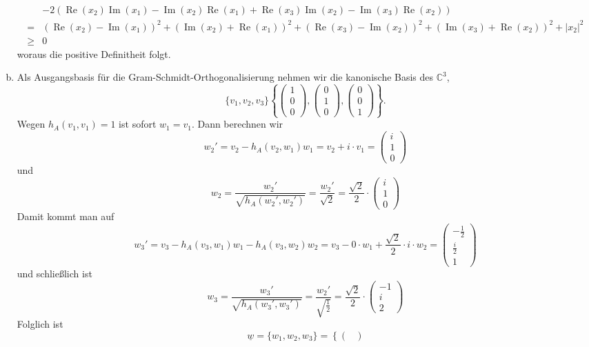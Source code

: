 \documentclass{article}
\theoremstyle{definition}
\newcommand{\C}{\mathbb{C}}
\newcommand{\re}{\operatorname{Re}}
\newcommand{\Ima}{\operatorname{Im}}
\begin{document}
\begin{enumerate}[(a)]
\begin{align*}
		 &- 2(\re(x_2)\Ima(x_1) - \Ima(x_2)\re(x_1) + \re(x_3)\Ima(x_2) -\Ima(x_3)\re(x_2))\\
		=& (\re(x_2) - \Ima(x_1))^2 + (\Ima(x_2) + \re(x_1))^2 + (\re(x_3) - \Ima(x_2))^2 + (\Ima(x_3) + \re(x_2))^2 + |x_2|^2\\
		\geq&0
	\end{align*} woraus die positive Definitheit folgt.
	\item Als Ausgangsbasis für die Gram-Schmidt-Orthogonalisierung nehmen wir die kanonische Basis des $\C^3$, $$\{v_1, v_2, v_3\} \left\{\begin{pmatrix}
		1\\0\\0
	\end{pmatrix}, \begin{pmatrix}
		0\\1\\0
	\end{pmatrix}, \begin{pmatrix}
		0\\0\\1
	\end{pmatrix}\right\}.$$ Wegen $h_A(v_1, v_1) = 1$ ist sofort $w_1 = v_1$. Dann berechnen wir $$w_2' = v_2 - h_A(v_2, w_1)w_1 = v_2 + i\cdot v_1 = \begin{pmatrix}
		i\\
		1\\
		0
	\end{pmatrix}$$
	und $$w_2 = \frac{w_2'}{\sqrt{h_A(w_2', w_2')}} = \frac{w_2'}{\sqrt{2}} = \frac{\sqrt{2}}{2}\cdot \begin{pmatrix}
		i\\
		1\\
		0
	\end{pmatrix}$$
	Damit kommt man auf $$w_3' = v_3 - h_A(v_3, w_1)w_1 - h_A(v_3, w_2)w_2 = v_3 - 0\cdot w_1 + \frac{\sqrt{2}}{2}\cdot i \cdot w_2 = \begin{pmatrix}
		-\frac{1}{2}\\
		\frac{i}{2}\\
		1
	\end{pmatrix}$$
	und schließlich ist $$w_3 = \frac{w_3'}{\sqrt{h_A(w_3', w_3')}} = \frac{w_2'}{\sqrt{\frac{1}{2}}} = \frac{\sqrt{2}}{2}\cdot \begin{pmatrix}
		-1\\
		i\\
		2
	\end{pmatrix}$$
	Folglich ist $$\underline{w} = \{w_1, w_2, w_3\} = \left\{\begin{pmatrix}

\end{pmatrix}$$
\end{enumerate}
\end{document}
